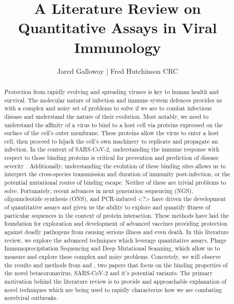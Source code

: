 \documentclass{article}
\title{A Literature Review on Quantitative Assays in Viral Immunology}
\author{Jared Galloway | Fred Hutchinson CRC}
\begin{document}
\maketitle

\begin{abstract}
Protection from rapidly evolving and spreading viruses is key to human health and survival.
The molecular nature of infection and immune system defences provides us with a complex and noisy set of problems to solve
if we are to combat infectious disease and understand the nature of their evolution.
Most notably, we need to understand the affinity of a virus to bind to a host cell via proteins expressed on the surface of the cell's outer membrane.
These proteins allow the virus to enter a host cell, then proceed to hijack the cell's own machinery to replicate and propagate an infection.
In the context of SARS-CoV-2, understanding the immune response with respect to those binding proteins is critical
for prevention and prediction of disease severity \citet{Stoddard2020}.
Additionally, understanding the evolution of these binding sites allows us to interpret the cross-species transmission
and duration of immunity post-infection, or the potential mutational routes of binding escape.
Neither of these are trivial problems to solve. 
Fortunately, recent advances in next generation sequencing (NGS), oligonucleotide synthesis (ONS), and PCR-induced <?>
have driven the development of quantitative assays and given us the ability to explore and quantify fitness of particular sequences in the context of protein interaction.
These methods have laid the foundation for exploration and development of advanced vaccines providing protection against deadly pathogens
from causing serious illness and even death.
In this literature review, we explore the advanced techniques which leverage quantitative assays, Phage Immunoprecipitation Sequencing
and Deep Mutational Scanning, which allow us to measure and explore these complex and noisy problems.
Concretely, we will observe the results and methods from \citet{Shrock2020} and \citet{Starr2020}, 
two papers that focus on the binding properties of the novel betacoronavirus, SARS-CoV-2 and it's potential variants.
The primary motivation behind the literature review is to provide and approachable explanation of novel techniques which are being used to rapidly characterize how we are combating novelviral outbreaks.
\end{abstract}
\end{document}
